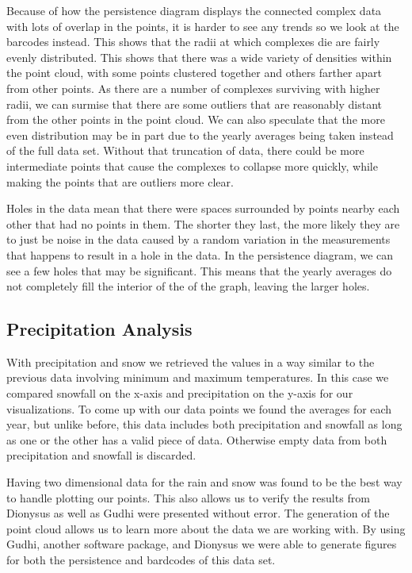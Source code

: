 \documentclass[12pt]{report}
\begin{document}
Because of how the persistence diagram displays the connected complex data with lots of overlap in the points, it is harder to see any trends so we look at the barcodes instead. This shows that the radii at which complexes die are fairly evenly distributed. This shows that there was a wide variety of densities within the point cloud, with some points clustered together and others farther apart from other points. As there are a number of complexes surviving with higher radii, we can surmise that there are some outliers that are reasonably distant from the other points in the point cloud. We can also speculate that the more even distribution may be in part due to the yearly averages being taken instead of the full data set. Without that truncation of data, there could be more intermediate points that cause the complexes to collapse more quickly, while making the points that are outliers more clear. 

Holes in the data mean that there were spaces surrounded by points nearby each other that had no points in them. The shorter they last, the more likely they are to just be noise in the data caused by a random variation in the measurements that happens to result in a hole in the data. In the persistence diagram, we can see a few holes that may be significant. This means that the yearly averages do not completely fill the interior of the of the graph, leaving the larger holes.







\clearpage
\subsection*{Precipitation Analysis}
With precipitation and snow we retrieved the values in a way similar to the previous data involving minimum and maximum temperatures. In this case we compared snowfall on the x-axis and precipitation on the y-axis for our visualizations. To come up with our data points we found the averages for each year, but unlike before, this data includes both precipitation and snowfall as long as one or the other has a valid piece of data. Otherwise empty data from both precipitation and snowfall is discarded.\par 

Having two dimensional data for the rain and snow was found to be the best way to handle plotting our points. This also allows us to verify the results from Dionysus as well as Gudhi were presented without error. The generation of the point cloud allows us to learn more about the data we are working with. By using Gudhi, another software package, and Dionysus we were able to generate figures for both the persistence and bardcodes of this data set.\par
\end{document}
